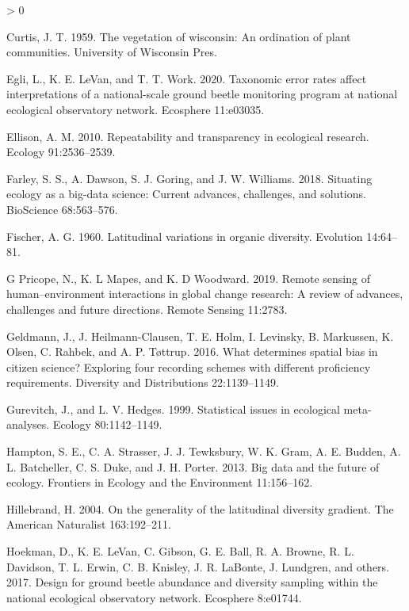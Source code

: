 \documentclass[
  12pt,
]{article}
\newlength{\cslhangindent}
\newenvironment{CSLReferences}[2] %
 {%
  \setlength{\parindent}{0pt}
  \ifodd #1 \everypar{\setlength{\hangindent}{\cslhangindent}}\ignorespaces\fi
  \ifnum #2 > 0
  \setlength{\parskip}{#2\baselineskip}
  \fi
 }%
 {}
\begin{document}
\begin{CSLReferences}{1}{0}
\leavevmode\hypertarget{ref-curtis1959vegetation}{}%
Curtis, J. T. 1959. The vegetation of wisconsin: An ordination of plant communities. University of Wisconsin Pres.

\leavevmode\hypertarget{ref-egli2020taxonomic}{}%
Egli, L., K. E. LeVan, and T. T. Work. 2020. Taxonomic error rates affect interpretations of a national-scale ground beetle monitoring program at national ecological observatory network. Ecosphere 11:e03035.

\leavevmode\hypertarget{ref-ellison2010repeatability}{}%
Ellison, A. M. 2010. Repeatability and transparency in ecological research. Ecology 91:2536--2539.

\leavevmode\hypertarget{ref-farley2018situating}{}%
Farley, S. S., A. Dawson, S. J. Goring, and J. W. Williams. 2018. Situating ecology as a big-data science: Current advances, challenges, and solutions. BioScience 68:563--576.

\leavevmode\hypertarget{ref-fischer1960latitudinal}{}%
Fischer, A. G. 1960. Latitudinal variations in organic diversity. Evolution 14:64--81.

\leavevmode\hypertarget{ref-g2019remote}{}%
G Pricope, N., K. L Mapes, and K. D Woodward. 2019. Remote sensing of human--environment interactions in global change research: A review of advances, challenges and future directions. Remote Sensing 11:2783.

\leavevmode\hypertarget{ref-geldmann2016determines}{}%
Geldmann, J., J. Heilmann-Clausen, T. E. Holm, I. Levinsky, B. Markussen, K. Olsen, C. Rahbek, and A. P. Tøttrup. 2016. What determines spatial bias in citizen science? Exploring four recording schemes with different proficiency requirements. Diversity and Distributions 22:1139--1149.

\leavevmode\hypertarget{ref-gurevitch1999statistical}{}%
Gurevitch, J., and L. V. Hedges. 1999. Statistical issues in ecological meta-analyses. Ecology 80:1142--1149.

\leavevmode\hypertarget{ref-hampton2013big}{}%
Hampton, S. E., C. A. Strasser, J. J. Tewksbury, W. K. Gram, A. E. Budden, A. L. Batcheller, C. S. Duke, and J. H. Porter. 2013. Big data and the future of ecology. Frontiers in Ecology and the Environment 11:156--162.

\leavevmode\hypertarget{ref-hillebrand2004generality}{}%
Hillebrand, H. 2004. On the generality of the latitudinal diversity gradient. The American Naturalist 163:192--211.

\leavevmode\hypertarget{ref-hoekman2017design}{}%
Hoekman, D., K. E. LeVan, C. Gibson, G. E. Ball, R. A. Browne, R. L. Davidson, T. L. Erwin, C. B. Knisley, J. R. LaBonte, J. Lundgren, and others. 2017. Design for ground beetle abundance and diversity sampling within the national ecological observatory network. Ecosphere 8:e01744.


\end{CSLReferences}
\end{document}
